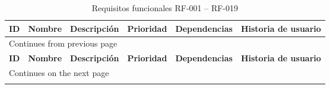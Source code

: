 \renewcommand{\arraystretch}{1.3} %
\begin{longtable}{ p{1.2cm}  p{2cm}  p{3.5cm}  p{1.5cm}  p{2.2cm}  p{1.9cm} }
    \caption{Requisitos funcionales RF-001 – RF-019} \label{tab:requisitos-funcionales} \\
    \toprule
    \textbf{ID} & \textbf{Nombre} & \textbf{Descripción} & \textbf{Prioridad} & \textbf{Dependencias} & \textbf{Historia de usuario} \\
    \toprule
    \endfirsthead

    \multicolumn{3}{l}{\footnotesize Continues from previous page} \\
    \toprule
    \textbf{ID} & \textbf{Nombre} & \textbf{Descripción} & \textbf{Prioridad} & \textbf{Dependencias} & \textbf{Historia de usuario} \\
    \midrule
    \endhead

    \bottomrule
    \multicolumn{3}{l}{\footnotesize Continues on the next page} \\
    \endfoot
    
    \bottomrule
    \endlastfoot


\end{longtable}
